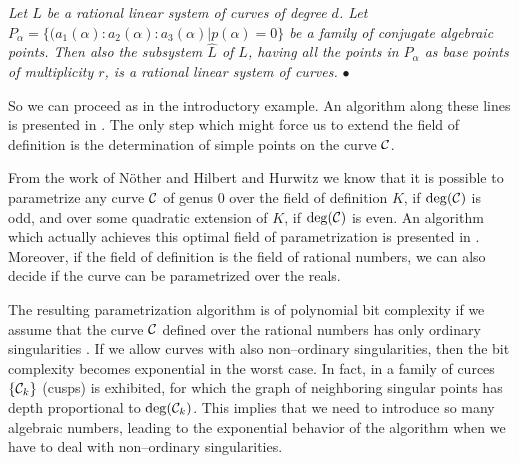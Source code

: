 \vspace{2 mm}

 {\sl Let $L$ be a rational linear system of
curves of degree $d$.
Let $P_\alpha = \{(a_1(\alpha):a_2(\alpha):a_3(\alpha) | p(\alpha)
            =0\}$ be a family of conjugate algebraic points.
Then also the subsystem $\hat L$ of $L$, having all the points
in $P_\alpha$ as base points of multiplicity $r$, is a rational
linear system of curves. } \hfill$\bullet$

\vspace{2 mm}

So we can proceed as in the introductory example. 
An algorithm along these lines is presented in  \cite{SeW91}.
The only
step which might force us to extend the field of definition is
the determination of simple points on the curve $\cal C$.



From the work of N\"other \cite{Noe}   and
Hilbert and Hurwitz \cite{HiH}      we
know that it is possible to parametrize any curve $\cal C$ of genus 0
over the field of definition $K$, if $\deg({\cal C})$ is odd,
and over some quadratic extension of $K$, if $\deg({\cal C})$ is even.
An algorithm which actually achieves this optimal field of 
parametrization is presented in \cite{SeW94}.
Moreover, if the field of definition is the field of rational
numbers, we can also
decide if the curve can be parametrized over the reals.

\newpage

\noindent {}

\vspace{5mm}

The resulting parametrization algorithm is of polynomial bit complexity
if we assume that the curve $\cal C$ defined over the rational numbers
has only ordinary singularities
\cite{MSW}.
If we allow curves with also non--ordinary singularities, then
the bit complexity 
becomes exponential in the worst case.
In fact, in  \cite{MSW}    a family of curces $\{{\cal C}_k\}$ (cusps) is
exhibited, for which the graph of neighboring singular points has
depth proportional to $\deg({\cal C}_k)$. This implies that we need
to introduce so many algebraic numbers, leading to the exponential
behavior of the algorithm when we have to deal with non--ordinary
singularities.



\vspace{5 mm}


